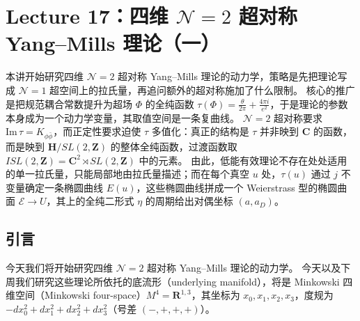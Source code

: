 
\section{Lecture 17：四维 $\mathcal{N}=2$ 超对称 Yang--Mills 理论（一）}

\begin{keytakeaways}
本讲开始研究四维 $\mathcal{N}=2$ 超对称 Yang--Mills 理论的动力学，策略是先把理论写成 $\mathcal{N}=1$ 超空间上的拉氏量，再追问额外的超对称施加了什么限制。
核心的推广是把规范耦合常数提升为超场 $\Phi$ 的全纯函数 $\tau(\Phi)=\frac{\theta}{2\pi}+\frac{4\pi i}{e^2}$，于是理论的参数本身成为一个动力学变量，其取值空间是一条复曲线。
$\mathcal{N}=2$ 超对称要求 $\mathrm{Im}\,\tau=K_{\phi\bar\phi}$，而正定性要求迫使 $\tau$ 多值化：真正的结构是 $\tau$ 并非映到 $\mathbf{C}$ 的函数，而是映到 $\mathbf{H}/SL(2,\mathbf{Z})$ 的整体全纯函数，过渡函数取 $ISL(2,\mathbf{Z})=\mathbf{C}^2\rtimes SL(2,\mathbf{Z})$ 中的元素。
由此，低能有效理论不存在处处适用的单一拉氏量，只能局部地由拉氏量描述；而在每个真空 $u$ 处，$\tau(u)$ 通过 $j$ 不变量确定一条椭圆曲线 $E(u)$，这些椭圆曲线拼成一个 Weierstrass 型的椭圆曲面 $\mathcal{E}\to U$，其上的全纯二形式 $\eta$ 的周期给出对偶坐标 $(a,a_D)$。
\end{keytakeaways}


\subsection{引言}

今天我们将开始研究四维 $\mathcal{N}=2$ 超对称 Yang--Mills 理论的动力学。
今天以及下周我们研究这些理论所依托的底流形（underlying manifold），将是 Minkowski 四维空间（Minkowski four-space）$M^4=\mathbf{R}^{1,3}$，其坐标为 $x_0,x_1,x_2,x_3$，度规为 $-dx_0^2+dx_1^2+dx_2^2+dx_3^2$（号差 $(-,+,+,+)$）。



